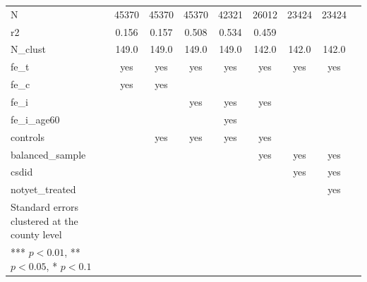 {\begin{tabular}{l*{8}{c}}
 
    \midrule %
N                   &       45370   &       45370   &       45370   &       42321   &       26012   &       23424   &       23424   \\
r2                  &       0.156   &       0.157   &       0.508   &       0.534   &       0.459   &               &               \\
N\_clust             &       149.0   &       149.0   &       149.0   &       149.0   &       142.0   &       142.0   &       142.0   \\
fe\_t                &         yes   &         yes   &         yes   &         yes   &         yes   &         yes   &         yes   \\
fe\_c                &         yes   &         yes   &               &               &               &               &               \\
 fe\_i                &               &               &         yes   &         yes   &         yes   &               &               \\
fe\_i\_age60          &               &               &               &         yes   &               &               &               \\
controls            &               &         yes   &         yes   &         yes   &         yes   &               &               \\
balanced\_sample     &               &               &               &               &         yes   &         yes   &         yes   \\
csdid               &               &               &               &               &               &         yes   &         yes   \\
notyet\_treated               &               &               &               &               &               &         &         yes   \\

    \bottomrule\bottomrule
    Standard errors clustered at the county level &       &       &       &       &  \\
    *** $p<0.01$, ** $p<0.05$, * $p<0.1$ &       &       &       &       &  \\
    \end{tabular}
}

